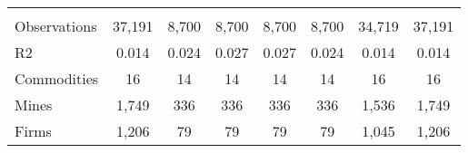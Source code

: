 \begin{tabular}{lccccccc}
      &       &       &       &       &       &       &  \\
Observations & 37,191 & 8,700 & 8,700 & 8,700 & 8,700 & 34,719 & 37,191 \\
R2    & \multicolumn{1}{p{5em}}{0.014} & \multicolumn{1}{p{5em}}{0.024} & \multicolumn{1}{p{5em}}{0.027} & 0.027 & \multicolumn{1}{p{5em}}{0.024} & \multicolumn{1}{p{5em}}{0.014} & \multicolumn{1}{p{5em}}{0.014} \\
Commodities & 16    & 14    & 14    & 14    & 14    & 16    & 16 \\
Mines & 1,749 & 336   & 336   & 336   & 336   & 1,536 & 1,749 \\
Firms & 1,206 & 79    & 79    & 79    & 79    & 1,045 & 1,206 \bigstrut[b]\\
\hline
\end{tabular}%
